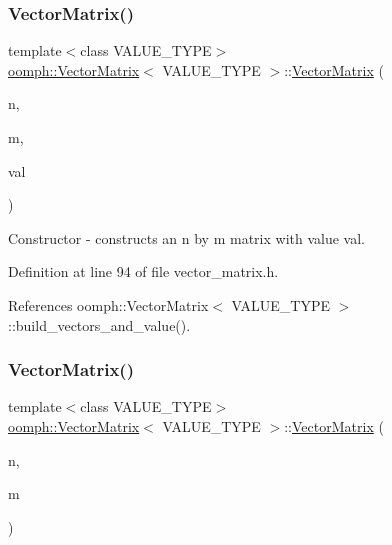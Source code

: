 \subsubsection{\texorpdfstring{Vector\+Matrix()}{VectorMatrix()}\hspace{0.1cm}{\footnotesize\ttfamily [2/3]}}
{\footnotesize\ttfamily template$<$class V\+A\+L\+U\+E\+\_\+\+T\+Y\+PE$>$ \\
\hyperlink{classoomph_1_1VectorMatrix}{oomph\+::\+Vector\+Matrix}$<$ V\+A\+L\+U\+E\+\_\+\+T\+Y\+PE $>$\+::\hyperlink{classoomph_1_1VectorMatrix}{Vector\+Matrix} (\begin{DoxyParamCaption}\item[{const unsigned \&}]{n,  }\item[{const unsigned \&}]{m,  }\item[{const V\+A\+L\+U\+E\+\_\+\+T\+Y\+PE \&}]{val }\end{DoxyParamCaption})\hspace{0.3cm}{\ttfamily [inline]}}



Constructor -\/ constructs an n by m matrix with value val. 



Definition at line 94 of file vector\+\_\+matrix.\+h.



References oomph\+::\+Vector\+Matrix$<$ V\+A\+L\+U\+E\+\_\+\+T\+Y\+P\+E $>$\+::build\+\_\+vectors\+\_\+and\+\_\+value().

\mbox{\label{classoomph_1_1VectorMatrix_afb605d9b666be1184a9b39fddee6faec}} 
\subsubsection{\texorpdfstring{Vector\+Matrix()}{VectorMatrix()}\hspace{0.1cm}{\footnotesize\ttfamily [3/3]}}
{\footnotesize\ttfamily template$<$class V\+A\+L\+U\+E\+\_\+\+T\+Y\+PE$>$ \\
\hyperlink{classoomph_1_1VectorMatrix}{oomph\+::\+Vector\+Matrix}$<$ V\+A\+L\+U\+E\+\_\+\+T\+Y\+PE $>$\+::\hyperlink{classoomph_1_1VectorMatrix}{Vector\+Matrix} (\begin{DoxyParamCaption}\item[{const unsigned \&}]{n,  }\item[{const unsigned \&}]{m }\end{DoxyParamCaption})\hspace{0.3cm}{\ttfamily [inline]}}



